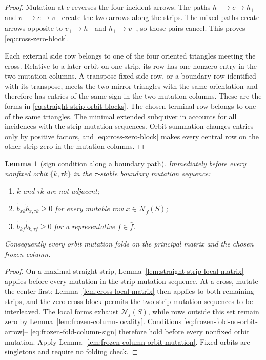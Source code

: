 \documentclass[11pt]{amsart}
\newtheorem{lemma}[theorem]{Lemma}
\theoremstyle{definition}
\theoremstyle{remark}
\begin{document}
\begin{proof}
Mutation at $c$ reverses the four incident arrows.  The paths
$h_-\to c\to h_+$ and $v_-\to c\to v_+$ create the two arrows along the
strips.  The mixed paths create arrows opposite to $v_+\to h_-$ and
$h_+\to v_-$, so those pairs cancel.  This proves
\eqref{eq:cross-zero-block}.

Each external side row belongs to one of the four oriented triangles
meeting the cross.  Relative to a later orbit on one strip, its row has one
nonzero entry in the two mutation columns.  A transpose-fixed side row, or a boundary
row identified with its transpose, meets the two mirror triangles with the
same orientation and therefore has entries of the same sign in the two
mutation columns.  These are the forms in
\eqref{eq:straight-strip-orbit-blocks}.  The chosen terminal row belongs to
one of the same triangles.  The minimal extended subquiver in
\cite[Lemma~6.16]{FeiKroneckerII} accounts for all incidences with the strip
mutation sequences.  Orbit summation changes entries only by positive factors, and
\eqref{eq:cross-zero-block} makes every central row on the other strip zero
in the mutation columns.
\end{proof}

\begin{lemma}[sign condition along a boundary path]
\label{lem:boundary-path-sign-invariant}
Immediately before every nonfixed orbit $\{k,\tau k\}$ in the
$\tau$-stable boundary mutation sequence:
\begin{enumerate}
 \item $k$ and $\tau k$ are not adjacent;
 \item $\widetilde b_{xk}\widetilde b_{x,\tau k}\ge0$ for every
       mutable row $x\in\mathcal N_{\bar f}(S)$;
 \item $\widetilde b_{k f}\widetilde b_{k,\tau f}\ge0$ for a
       representative $f\in\bar f$.
\end{enumerate}
Consequently every orbit mutation folds on the principal matrix and the
chosen frozen column.
\end{lemma}

\begin{proof}
On a maximal straight strip, Lemma~\ref{lem:straight-strip-local-matrix}
applies before every mutation in the strip mutation sequence.  At a cross, mutate the
center first; Lemma~\ref{lem:cross-local-matrix} then applies to both
remaining strips, and the zero cross-block permits the two strip mutation
sequences to be interleaved.  The local forms exhaust $\mathcal N_{\bar f}(S)$, while
rows outside this set remain zero by
Lemma~\ref{lem:frozen-column-locality}.  Conditions
\eqref{eq:frozen-fold-no-orbit-arrow}--
\eqref{eq:frozen-fold-column-sign} therefore hold before every nonfixed
orbit mutation.  Apply Lemma~\ref{lem:frozen-column-orbit-mutation}.  Fixed
orbits are singletons and require no folding check.
\end{proof}
\end{document}
